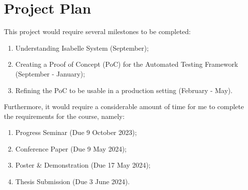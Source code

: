 \section{Project Plan}

This project would require several milestones to be completed:
\begin{enumerate}
    \item Understanding Isabelle System (September);
    \item Creating a Proof of Concept (PoC) for the Automated Testing Framework (September - January);
    \item Refining the PoC to be usable in a production setting (February - May).
\end{enumerate}

Furthermore, it would require a considerable amount of time for me to complete the requirements for the course, namely:
\begin{enumerate}
    \item Progress Seminar (Due 9 October 2023);
    \item Conference Paper (Due 9 May 2024);
    \item Poster \& Demonstration (Due 17 May 2024);
    \item Thesis Submission (Due 3 June 2024).
\end{enumerate}





